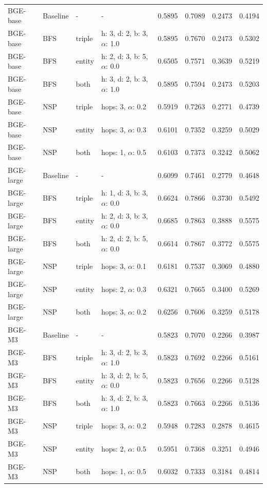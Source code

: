 \documentclass[11pt]{article}
\begin{document}
\begin{table}[t]
\begin{tabular}{llllcccc}
BGE-base & Baseline & - & - & 0.5895 & 0.7089 & 0.2473 & 0.4194 \\
BGE-base & BFS & triple & h: 3, d: 2, b: 3, $\alpha$: 1.0 & 0.5895 & 0.7670 & 0.2473 & 0.5302 \\
BGE-base & BFS & entity & h: 2, d: 3, b: 5, $\alpha$: 0.0 & 0.6505 & 0.7571 & 0.3639 & 0.5219 \\
BGE-base & BFS & both & h: 3, d: 2, b: 3, $\alpha$: 1.0 & 0.5895 & 0.7594 & 0.2473 & 0.5203 \\
BGE-base & NSP & triple & hops: 3, $\alpha$: 0.2 & 0.5919 & 0.7263 & 0.2771 & 0.4739 \\
BGE-base & NSP & entity & hops: 3, $\alpha$: 0.3 & 0.6101 & 0.7352 & 0.3259 & 0.5029 \\
BGE-base & NSP & both & hops: 1, $\alpha$: 0.5 & 0.6103 & 0.7373 & 0.3242 & 0.5062 \\

BGE-large & Baseline & - & - & 0.6099 & 0.7461 & 0.2779 & 0.4648 \\
BGE-large & BFS & triple & h: 1, d: 3, b: 3, $\alpha$: 0.0 & 0.6624 & 0.7866 & 0.3730 & 0.5492 \\
BGE-large & BFS & entity & h: 2, d: 3, b: 3, $\alpha$: 0.0 & 0.6685 & 0.7863 & 0.3888 & 0.5575 \\
BGE-large & BFS & both & h: 2, d: 2, b: 5, $\alpha$: 0.0 & 0.6614 & 0.7867 & 0.3772 & 0.5575 \\
BGE-large & NSP & triple & hops: 3, $\alpha$: 0.1 & 0.6181 & 0.7537 & 0.3069 & 0.4880 \\
BGE-large & NSP & entity & hops: 2, $\alpha$: 0.3 & 0.6321 & 0.7665 & 0.3400 & 0.5269 \\
BGE-large & NSP & both & hops: 3, $\alpha$: 0.2 & 0.6256 & 0.7606 & 0.3259 & 0.5178 \\

BGE-M3 & Baseline & - & - & 0.5823 & 0.7070 & 0.2266 & 0.3987 \\
BGE-M3 & BFS & triple & h: 3, d: 2, b: 3, $\alpha$: 1.0 & 0.5823 & 0.7692 & 0.2266 & 0.5161 \\
BGE-M3 & BFS & entity & h: 3, d: 2, b: 5, $\alpha$: 0.0 & 0.5823 & 0.7656 & 0.2266 & 0.5128 \\
BGE-M3 & BFS & both & h: 3, d: 2, b: 3, $\alpha$: 1.0 & 0.5823 & 0.7663 & 0.2266 & 0.5136 \\
BGE-M3 & NSP & triple & hops: 3, $\alpha$: 0.2 & 0.5948 & 0.7283 & 0.2878 & 0.4615 \\
BGE-M3 & NSP & entity & hops: 2, $\alpha$: 0.5 & 0.5951 & 0.7368 & 0.3251 & 0.4946 \\
BGE-M3 & NSP & both & hops: 1, $\alpha$: 0.5 & 0.6032 & 0.7333 & 0.3184 & 0.4814 \\


\end{tabular}
\end{table}
\end{document}

